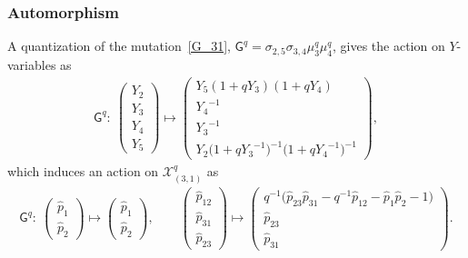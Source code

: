 \documentclass[pdftex]{sigma}
\numberwithin{equation}{section}
\begin{document}
\subsubsection*{Automorphism}
A quantization of the mutation~\eqref{G_31}, $\mathsf{G}^q=\sigma_{2,5} \sigma_{3,4} \mu^q_3 \mu^q_4$, gives the action on $Y$-variables as
\begin{gather*}
 \mathsf{G}^q \colon \
 \begin{pmatrix}
 Y_2 \\ Y_3 \\ Y_4 \\ Y_5
 \end{pmatrix}
 \mapsto
 \begin{pmatrix}
 Y_5 ( 1 + q Y_3 ) ( 1 + q Y_4 ) \\
 {Y_4}^{-1} \\
 {Y_3}^{-1} \\
 Y_2 \big( 1 + q {Y_3}^{-1} \big)^{-1} \big( 1 + q {Y_4}^{-1} \big)^{-1}
 \end{pmatrix} ,
\end{gather*}
which induces an action on $\mathcal{X}^q_{(3,1)}$ as
\begin{gather*}
 \mathsf{G}^q\colon \
 \begin{pmatrix}
 \hat{p}_1 \\
 \hat{p}_2
 \end{pmatrix}
 \mapsto
 \begin{pmatrix}
 \hat{p}_1 \\
 \hat{p}_2
 \end{pmatrix} , \qquad
 \begin{pmatrix}
 \hat{p}_{12} \\
 \hat{p}_{31} \\
 \hat{p}_{23}
 \end{pmatrix}
 \mapsto
 \begin{pmatrix}
 q^{-1} \big( \hat{p}_{23} \hat{p}_{31} - q^{-1} \hat{p}_{12} - \hat{p}_1 \hat{p}_2 -1 \big) \\
 \hat{p}_{23} \\
 \hat{p}_{31}
 \end{pmatrix} .
\end{gather*}
\end{document}
